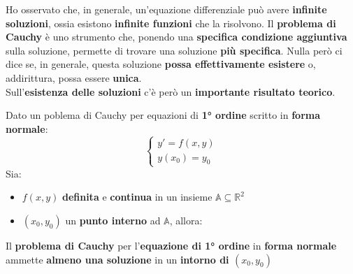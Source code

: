 \documentclass[a4paper, oneside]{article}
\newcommand\R{\mathbb{R}}
\newcommand\A{\mathbb{A}}
\begin{document}
    \newpage
    \noindent Ho osservato che, in generale, un'equazione differenziale può avere \textbf{infinite soluzioni}, ossia esistono \textbf{infinite funzioni}
    che la risolvono. Il \textbf{problema di Cauchy} è uno strumento che, ponendo una \textbf{specifica condizione aggiuntiva} sulla soluzione,
    permette di trovare una soluzione \textbf{più specifica}. Nulla però ci dice se, in generale, questa soluzione \textbf{possa effettivamente 
    esistere} o, addirittura, possa essere \textbf{unica}. \\
    Sull'\textbf{esistenza delle soluzioni} c'è però un \textbf{importante risultato teorico}. 



    \begin{theorem}
        Dato un poblema di Cauchy per equazioni di \textbf{1° ordine} scritto in \textbf{forma normale}:
        \[\begin{cases}
            y'=f(x,y) \\
            y(x_0)=y_0
        \end{cases}\]
        Sia:
        \begin{itemize}
            \item $f(x,y)$ \textbf{definita} e \textbf{continua} in un insieme $\A\subseteq \R^2$
            \item $(x_0,y_0)$ un \textbf{punto interno} ad $\A$, allora:
        \end{itemize}
        \noindent
        Il \textbf{problema di Cauchy} per l'\textbf{equazione di 1° ordine} in \textbf{forma normale} ammette 
        \textbf{almeno una soluzione} in un \textbf{intorno di $(x_0,y_0)$}
    \end{theorem}
\end{document}
